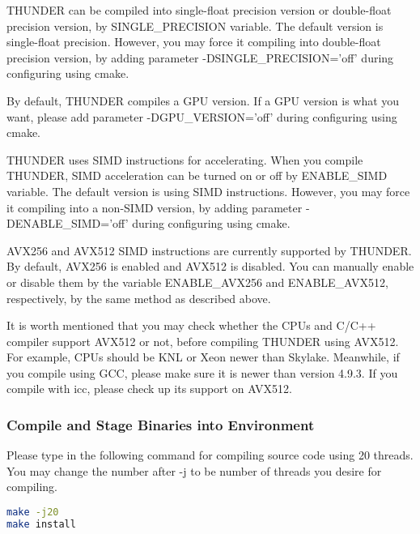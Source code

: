 \documentclass{article}
\begin{document}
                THUNDER can be compiled into single-float precision version or double-float precision version, by \textsf{SINGLE\_PRECISION} variable. The default version is single-float precision. However, you may force it compiling into double-float precision version, by adding parameter \textsf{-DSINGLE\_PRECISION='off'} during configuring using \textsf{cmake}.
                
                By default, THUNDER compiles a GPU version. If a GPU version is what you want, please add parameter \textsf{-DGPU\_VERSION='off'} during configuring using \textsf{cmake}.
                
                THUNDER uses SIMD instructions for accelerating. When you compile THUNDER, SIMD acceleration can be turned on or off by \textsf{ENABLE\_SIMD} variable. The default version is using SIMD instructions. However, you may force it compiling into a non-SIMD version, by adding parameter \textsf{-DENABLE\_SIMD='off'} during configuring using \textsf{cmake}.
                
                AVX256 and AVX512 SIMD instructions are currently supported by THUNDER. By default, AVX256 is enabled and AVX512 is disabled. You can manually enable or disable them by the variable \textsf{ENABLE\_AVX256} and \textsf{ENABLE\_AVX512}, respectively, by the same method as described above.
                
                It is worth mentioned that you may check whether the CPUs and C/C++ compiler support AVX512 or not, before compiling THUNDER using AVX512. For example, CPUs should be KNL or Xeon newer than Skylake. Meanwhile, if you compile using \textsf{GCC}, please make sure it is newer than version 4.9.3. If you compile with icc, please check up its support on AVX512.
                
            \subsubsection{Compile and Stage Binaries into Environment}
            
                Please type in the following command for compiling source code using 20 threads. You may change the number after \textsf{-j} to be number of threads you desire for compiling.
                
                \begin{lstlisting}[language={sh}]
make -j20
make install
                \end{lstlisting}
                
\end{document}
